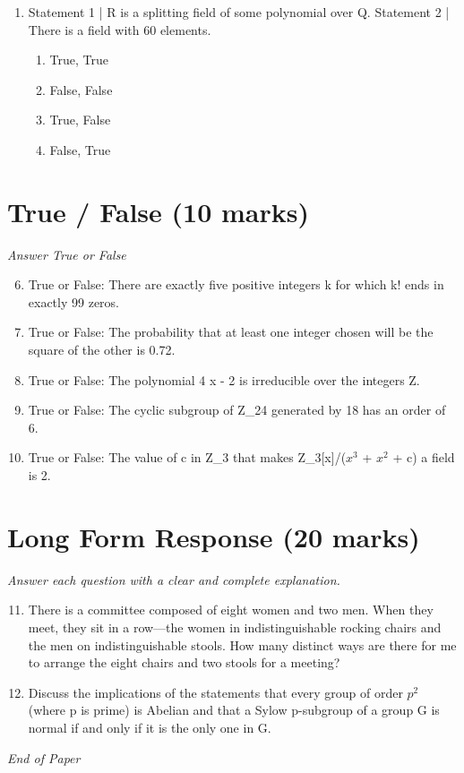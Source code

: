 \documentclass[12pt]{article}
\begin{document}
\begin{enumerate}[label=\arabic*.]
\begin{enumerate}[label=(\alph*)]
    \item -2
    \item -1
    \item 0
    \item 2
\end{enumerate}
\item Statement 1 | R is a splitting field of some polynomial over Q. Statement 2 | There is a field with 60 elements.
\begin{enumerate}[label=(\alph*)]
    \item True, True
    \item False, False
    \item True, False
    \item False, True
\end{enumerate}
\end{enumerate}

\section*{True / False (10 marks)}
\textit{Answer True or False}
\begin{enumerate}[label=\arabic*.]
\setcounter{enumi}{5}
\item True or False: There are exactly five positive integers k for which k! ends in exactly 99 zeros.
\item True or False: The probability that at least one integer chosen will be the square of the other is 0.72.
\item True or False: The polynomial 4 x - 2 is irreducible over the integers Z.
\item True or False: The cyclic subgroup of Z\_24 generated by 18 has an order of 6.
\item True or False: The value of c in Z\_3 that makes Z\_3[x]/($x^3$ + $x^2$ + c) a field is 2.
\end{enumerate}

\section*{Long Form Response (20 marks)}
\textit{Answer each question with a clear and complete explanation.}
\begin{enumerate}[label=\arabic*.]
\setcounter{enumi}{10}
\item There is a committee composed of eight women and two men. When they meet, they sit in a row---the women in indistinguishable rocking chairs and the men on indistinguishable stools. How many distinct ways are there for me to arrange the eight chairs and two stools for a meeting?
\item Discuss the implications of the statements that every group of order $p^2$ (where p is prime) is Abelian and that a Sylow p-subgroup of a group G is normal if and only if it is the only one in G.
\end{enumerate}

\vfill
\noindent\textit{End of Paper}
\end{document}
